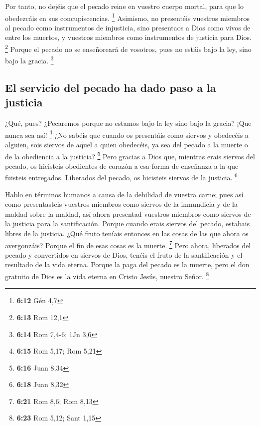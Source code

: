 \begin{paracol}{2}
 Por tanto, no dejéis que el pecado reine en vuestro
cuerpo mortal, para que lo obedezcáis en sus concupiscencias.
\footnote{\textbf{6:12} Gén 4,7}  Asimismo, no presentéis
vuestros miembros al pecado como instrumentos de injusticia, sino
presentaos a Dios como vivos de entre los muertos, y vuestros miembros
como instrumentos de justicia para Dios. \footnote{\textbf{6:13} Rom
  12,1}  Porque el pecado no se enseñoreará de vosotros,
pues no estáis bajo la ley, sino bajo la gracia. \footnote{\textbf{6:14}
  Rom 7,4-6; 1Jn 3,6}

\hypertarget{el-servicio-del-pecado-ha-dado-paso-a-la-justicia}{%
\subsection{El servicio del pecado ha dado paso a la
justicia}\label{el-servicio-del-pecado-ha-dado-paso-a-la-justicia}}

 ¿Qué, pues? ¿Pecaremos porque no estamos bajo la ley
sino bajo la gracia? ¡Que nunca sea así! \footnote{\textbf{6:15} Rom
  5,17; Rom 5,21}  ¿No sabéis que cuando os presentáis
como siervos y obedecéis a alguien, sois siervos de aquel a quien
obedecéis, ya sea del pecado a la muerte o de la obediencia a la
justicia? \footnote{\textbf{6:16} Juan 8,34}  Pero
gracias a Dios que, mientras erais siervos del pecado, os hicisteis
obedientes de corazón a esa forma de enseñanza a la que fuisteis
entregados.  Liberados del pecado, os hicisteis siervos
de la justicia. \footnote{\textbf{6:18} Juan 8,32}

 Hablo en términos humanos a causa de la debilidad de
vuestra carne; pues así como presentasteis vuestros miembros como
siervos de la inmundicia y de la maldad sobre la maldad, así ahora
presentad vuestros miembros como siervos de la justicia para la
santificación.  Porque cuando erais siervos del pecado,
estabais libres de la justicia.  ¿Qué fruto teníais
entonces en las cosas de las que ahora os avergonzáis? Porque el fin de
esas cosas es la muerte. \footnote{\textbf{6:21} Rom 8,6; Rom 8,13}
 Pero ahora, liberados del pecado y convertidos en
siervos de Dios, tenéis el fruto de la santificación y el resultado de
la vida eterna.  Porque la paga del pecado es la muerte,
pero el don gratuito de Dios es la vida eterna en Cristo Jesús, nuestro
Señor. \footnote{\textbf{6:23} Rom 5,12; Sant 1,15}


\end{paracol}
